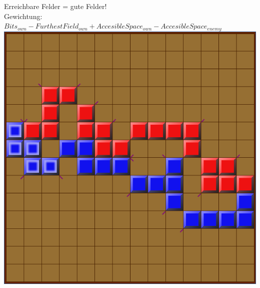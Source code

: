 \documentclass[12pt, draft]{beamer}
\begin{document}
\begin{frame}
	Erreichbare Felder = gute Felder!\\
	Gewichtung: $Bits_{own} - FurthestField_{own} + AccesibleSpace_{own} - AccesibleSpace_{enemy}$\\
	\pause
	\includegraphics[width=0.6\linewidth]{media/wgh21.png}
\end{frame}
\end{document}
